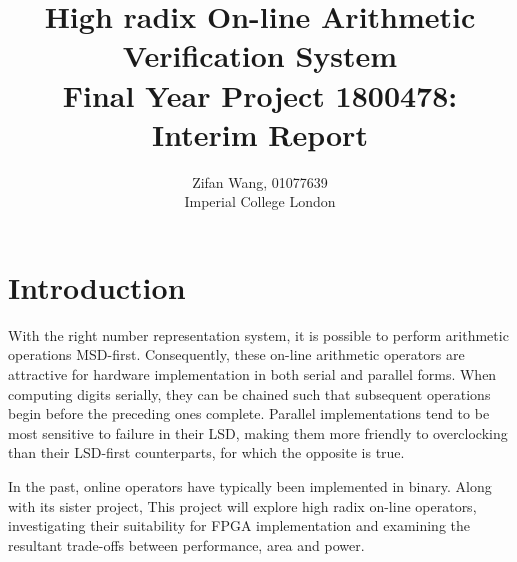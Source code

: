 \documentclass[journal]{IEEEtran}
\begin{document}
\title{%
  High radix On-line Arithmetic Verification System\\
  \large Final Year Project 1800478: Interim Report}
\author{Zifan Wang, 01077639\\Imperial College London}

\onecolumn
\maketitle
\tableofcontents

\twocolumn
\newpage

\section{Introduction}
With the right number representation system, it is possible to perform
arithmetic operations MSD-first.
Consequently, these on-line arithmetic operators are attractive
for hardware implementation in both serial and parallel forms.
When computing digits serially, they can be chained such that subsequent
operations begin before the preceding ones complete.
Parallel implementations tend to be most sensitive to failure in their LSD,
making them more friendly to overclocking than their LSD-first counterparts,
for which the opposite is true.

In the past, online operators have typically been implemented in binary.
Along with its sister project,
This project will explore high radix on-line operators,
investigating their suitability for FPGA implementation and examining the
resultant trade-offs between performance, area and power.
\end{document}

